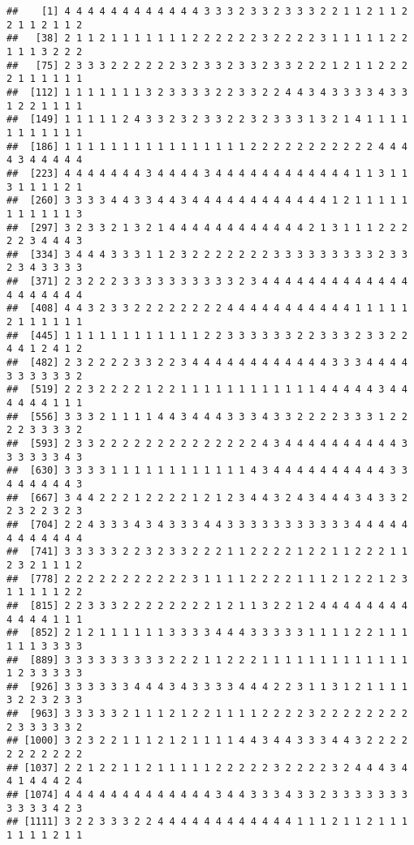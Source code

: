 \documentclass[
]{article}
\begin{document}
\begin{verbatim}
##    [1] 4 4 4 4 4 4 4 4 4 4 4 4 3 3 3 2 3 3 2 3 3 3 2 2 1 1 2 1 1 2 2 1 1 2 1 1 2
##   [38] 2 1 1 2 1 1 1 1 1 1 1 2 2 2 2 2 2 3 2 2 2 2 3 1 1 1 1 1 2 2 1 1 1 3 2 2 2
##   [75] 2 3 3 3 2 2 2 2 2 2 3 2 3 3 2 3 3 2 3 3 2 2 2 1 2 1 1 2 2 2 2 1 1 1 1 1 1
##  [112] 1 1 1 1 1 1 1 3 2 3 3 3 3 2 2 3 3 2 2 4 4 3 4 3 3 3 3 4 3 3 1 2 2 1 1 1 1
##  [149] 1 1 1 1 1 2 4 3 3 2 3 2 3 3 2 2 3 2 3 3 3 1 3 2 1 4 1 1 1 1 1 1 1 1 1 1 1
##  [186] 1 1 1 1 1 1 1 1 1 1 1 1 1 1 1 1 2 2 2 2 2 2 2 2 2 2 2 4 4 4 4 3 4 4 4 4 4
##  [223] 4 4 4 4 4 4 4 3 4 4 4 4 3 4 4 4 4 4 4 4 4 4 4 4 4 1 1 3 1 1 3 1 1 1 1 2 1
##  [260] 3 3 3 3 4 4 3 3 4 4 3 4 4 4 4 4 4 4 4 4 4 4 4 1 2 1 1 1 1 1 1 1 1 1 1 1 3
##  [297] 3 2 3 3 2 1 3 2 1 4 4 4 4 4 4 4 4 4 4 4 4 2 1 3 1 1 1 2 2 2 2 2 3 4 4 4 3
##  [334] 3 4 4 4 3 3 3 1 1 2 3 2 2 2 2 2 2 2 3 3 3 3 3 3 3 3 3 2 3 3 2 3 4 3 3 3 3
##  [371] 2 3 2 2 2 3 3 3 3 3 3 3 3 3 3 2 3 4 4 4 4 4 4 4 4 4 4 4 4 4 4 4 4 4 4 4 4
##  [408] 4 4 3 2 3 3 2 2 2 2 2 2 2 2 4 4 4 4 4 4 4 4 4 4 4 1 1 1 1 1 2 1 1 1 1 1 1
##  [445] 1 1 1 1 1 1 1 1 1 1 1 1 2 2 3 3 3 3 3 3 2 2 3 3 3 2 3 3 2 2 4 4 1 2 4 1 2
##  [482] 2 3 2 2 2 2 3 3 2 2 3 4 4 4 4 4 4 4 4 4 4 4 4 3 3 3 4 4 4 4 3 3 3 3 3 3 2
##  [519] 2 2 3 2 2 2 2 1 2 2 1 1 1 1 1 1 1 1 1 1 1 1 4 4 4 4 4 3 4 4 4 4 4 4 1 1 1
##  [556] 3 3 3 2 1 1 1 1 4 4 3 4 4 4 3 3 3 4 3 3 2 2 2 2 3 3 3 1 2 2 2 2 3 3 3 3 2
##  [593] 2 3 3 2 2 2 2 2 2 2 2 2 2 2 2 2 2 4 3 4 4 4 4 4 4 4 4 4 4 3 3 3 3 3 3 4 3
##  [630] 3 3 3 3 1 1 1 1 1 1 1 1 1 1 1 1 4 3 4 4 4 4 4 4 4 4 4 4 3 3 4 4 4 4 4 4 3
##  [667] 3 4 4 2 2 2 1 2 2 2 2 1 2 1 2 3 4 4 3 2 4 3 4 4 4 3 4 3 3 2 2 3 2 2 3 2 3
##  [704] 2 2 4 3 3 3 4 3 4 3 3 3 4 4 3 3 3 3 3 3 3 3 3 3 3 4 4 4 4 4 4 4 4 4 4 4 4
##  [741] 3 3 3 3 3 2 2 3 2 3 3 2 2 2 1 1 2 2 2 2 1 2 2 1 1 2 2 2 1 1 2 3 2 1 1 1 2
##  [778] 2 2 2 2 2 2 2 2 2 2 2 3 1 1 1 1 2 2 2 2 1 1 1 2 1 2 2 1 2 3 1 1 1 1 1 2 2
##  [815] 2 2 3 3 3 2 2 2 2 2 2 2 2 1 2 1 1 3 2 2 1 2 4 4 4 4 4 4 4 4 4 4 4 4 1 1 1
##  [852] 2 1 2 1 1 1 1 1 1 3 3 3 3 4 4 4 3 3 3 3 3 1 1 1 1 2 2 1 1 1 1 1 1 3 3 3 3
##  [889] 3 3 3 3 3 3 3 3 3 2 2 2 1 1 2 2 2 1 1 1 1 1 1 1 1 1 1 1 1 1 1 2 3 3 3 3 3
##  [926] 3 3 3 3 3 3 4 4 4 3 4 3 3 3 3 4 4 4 2 2 3 1 1 3 1 2 1 1 1 1 3 2 2 3 2 3 3
##  [963] 3 3 3 3 3 2 1 1 1 2 1 2 2 1 1 1 1 2 2 2 2 3 2 2 2 2 2 2 2 2 2 3 3 3 3 3 2
## [1000] 3 2 3 2 2 1 1 1 2 1 2 1 1 1 1 4 4 3 4 4 3 3 3 4 4 3 2 2 2 2 2 2 2 2 2 2 2
## [1037] 2 2 1 2 2 1 1 2 1 1 1 1 1 2 2 2 2 2 3 2 2 2 2 3 2 4 4 4 3 4 4 1 4 4 4 2 4
## [1074] 4 4 4 4 4 4 4 4 4 4 4 4 4 3 4 4 3 3 3 4 3 3 2 3 3 3 3 3 3 3 3 3 3 3 4 2 3
## [1111] 3 2 2 3 3 3 2 2 4 4 4 4 4 4 4 4 4 4 4 4 1 1 1 2 1 1 2 1 1 1 1 1 1 1 2 1 1

\end{verbatim}
\end{document}
